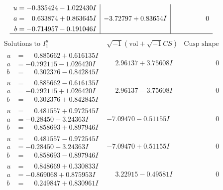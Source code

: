 \documentclass[1p]{elsarticle_modified}
\theoremstyle{definition}
\newcommand{\I}{\sqrt{-1}}
\begin{document}
$$\begin{array}{c|c|c}
\begin{aligned}
u &= -0.335424 - 1.022430 I \\
a &= \phantom{-}0.633874 + 0.863645 I \\
b &= -0.714957 - 0.191046 I\end{aligned}
 & -3.72797 + 0.83654 I & \phantom{-0.000000 } 0\\
 \hline 
 \end{array}$$\newpage$$\begin{array}{c|c|c}  
\text{Solutions to }I^u_{1}& \I (\text{vol} + \sqrt{-1}CS) & \text{Cusp shape}\\
 \hline 
\begin{aligned}
u &= \phantom{-}0.885662 + 0.616135 I \\
a &= -0.792115 - 1.026420 I \\
b &= \phantom{-}0.302376 - 0.842845 I\end{aligned}
 & \phantom{-}2.96137 + 3.75608 I & \phantom{-0.000000 } 0 \\ \hline\begin{aligned}
u &= \phantom{-}0.885662 - 0.616135 I \\
a &= -0.792115 + 1.026420 I \\
b &= \phantom{-}0.302376 + 0.842845 I\end{aligned}
 & \phantom{-}2.96137 - 3.75608 I & \phantom{-0.000000 } 0 \\ \hline\begin{aligned}
u &= \phantom{-}0.481557 + 0.972545 I \\
a &= -0.28450 - 3.24363 I \\
b &= \phantom{-}0.858693 + 0.897946 I\end{aligned}
 & -7.09470 - 0.51155 I & \phantom{-0.000000 } 0 \\ \hline\begin{aligned}
u &= \phantom{-}0.481557 - 0.972545 I \\
a &= -0.28450 + 3.24363 I \\
b &= \phantom{-}0.858693 - 0.897946 I\end{aligned}
 & -7.09470 + 0.51155 I & \phantom{-0.000000 } 0 \\ \hline\begin{aligned}
u &= \phantom{-}0.848669 + 0.330833 I \\
a &= -0.869068 + 0.875953 I \\
b &= \phantom{-}0.249847 + 0.830961 I\end{aligned}
 & \phantom{-}3.22915 - 0.49581 I & \phantom{-0.000000 } 0 \\ \hline\begin{aligned}

\end{aligned}
\end{array}$$
\end{document}
